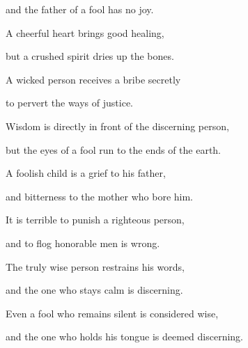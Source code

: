 {\par }{\Q and the father
of a fool
has no
joy.
\par }{\Q {}A cheerful
heart
brings good
healing,
\par }{\Q but a crushed
spirit
dries up
the bones.
\par }{\Q {}A wicked
person receives
a bribe
secretly
\par }{\Q to pervert
the ways
of justice.
\par }{\Q {}Wisdom
is directly
in front
of the discerning
person,
\par }{\Q but the eyes
of a fool
run to the ends
of the earth.
\par }{\Q {}A foolish
child
is a grief
to his father,
\par }{\Q and bitterness
to the mother who bore him.
\par }{\Q {}It is
terrible
to punish
a righteous
person,
\par }{\Q and to flog
honorable men is wrong.
\par }{\Q {}The truly wise person
restrains
his words,
\par }{\Q and the one
who stays calm
is discerning.
\par }{\Q {}Even
a fool
who remains silent
is considered
wise,
\par }{\Q and the one who holds
his tongue
is deemed discerning.

}
